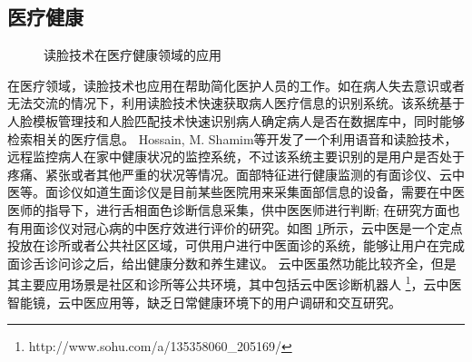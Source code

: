 \subsection{医疗健康}
\begin{figure}[h]
    \centering
    \caption{读脸技术在医疗健康领域的应用}
    \label{fig:med}
\end{figure}
在医疗领域，读脸技术也应用在帮助简化医护人员的工作。如在病人失去意识或者无法交流的情况下，利用读脸技术快速获取病人医疗信息的识别系统\cite{nwosu2016mobile}。该系统基于人脸模板管理技和人脸匹配技术快速识别病人确定病人是否在数据库中，同时能够检索相关的医疗信息。
Hossain, M. Shamim等\cite{Hossain2015Cloud}开发了一个利用语音和读脸技术，远程监控病人在家中健康状况的监控系统，不过该系统主要识别的是用户是否处于疼痛、紧张或者其他严重的状况等情况。面部特征进行健康监测的有面诊仪、云中医\cite{Zhang2018Study}等。面诊仪如道生面诊仪\cite{邸丹2016手持式舌象仪的研制}是目前某些医院用来采集面部信息的设备，需要在中医医师的指导下，进行舌相面色诊断信息采集，供中医医师进行判断; 在研究方面也有用面诊仪对冠心病的中医疗效进行评价的研究。如图 \ref{fig:med}所示，云中医是一个定点投放在诊所或者公共社区区域，可供用户进行中医面诊的系统，能够让用户在完成面诊舌诊问诊之后，给出健康分数和养生建议。
云中医虽然功能比较齐全，但是其主要应用场景是社区和诊所等公共环境，其中包括云中医诊断机器人 \footnote{http://www.sohu.com/a/135358060\_205169/}，云中医智能镜\cite{李雪2016}，云中医应用\cite{钱鹏基于云中医的健康监测方法及系统}等，缺乏日常健康环境下的用户调研和交互研究。

